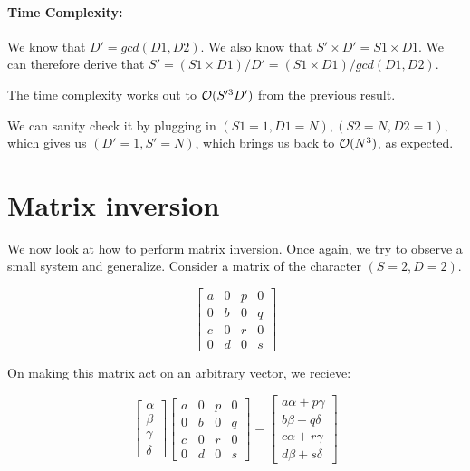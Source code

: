 \documentclass[11pt]{article}
\begin{document}
\paragraph{\textbf{Time Complexity:}}
We know that $D' = gcd(D1, D2)$. We also know that $S' \times D' = S1 \times D1$.
We can therefore derive that $S' = (S1 \times D1) / D' = (S1 \times D1) / gcd(D1, D2)$.

The time complexity works out to $\mathcal{O}(S'^3 D')$ from the previous result.

We can sanity check it by plugging in $(S1 = 1, D1 = N), (S2 = N, D2 = 1)$, which gives us
$(D' = 1, S' = N)$, which brings us back to $\mathcal{O}(N^3)$, as expected.


\section{Matrix inversion}
We now look at how to perform matrix inversion. Once again, we try to observe
a small system and generalize. Consider a matrix of the character $(S = 2, D = 2)$.

\[
    \left [
        \begin{array}{cc|cc}
            a & 0 & p & 0\\
            0 & b & 0 & q \\
            \hline
            c & 0 & r & 0 \\
            0 & d & 0 & s
        \end{array}
    \right ]
\]

On making this matrix act on an arbitrary vector, we recieve:


\[
    \begin{bmatrix} \alpha \\ \beta \\ \gamma \\ \delta \end{bmatrix}
    \left [
        \begin{array}{cc|cc}
            a & 0 & p & 0\\
            0 & b & 0 & q \\
            \hline
            c & 0 & r & 0 \\
            0 & d & 0 & s
        \end{array}
    \right ]
    =
    \begin{bmatrix}
        a \alpha + p \gamma \\
        b \beta + q \delta \\
        c \alpha + r \gamma \\
        d \beta + s \delta 
    \end{bmatrix}
\]
\end{document}
